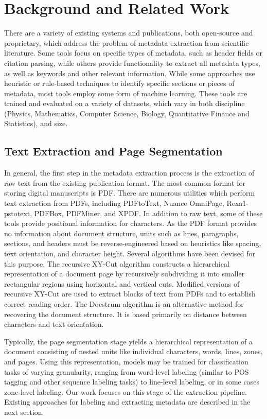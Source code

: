 \documentclass{acm_proc_article-sp}
\begin{document}
\section{Background and Related Work}
There are a variety of existing systems and publications, both open-source and proprietary, which address the problem of metadata extraction from scientific literature. Some tools focus on specific types of metadata, such as header fields or citation parsing, while others provide functionality to extract all metadata types, as well as keywords and other relevant information. While some approaches use heuristic or rule-based techniques to identify specific sections or pieces of metadata, most tools employ some form of machine learning. These tools are trained and evaluated on a variety of datasets, which vary in both discipline (Physics, Mathematics, Computer Science, Biology, Quantitative Finance and Statistics), and size. 

\subsection{Text Extraction and Page Segmentation}
In general, the first step in the metadata extraction process is the extraction of raw text from the existing publication format. The most common format for storing digital manuscripts is PDF. There are numerous utilities which perform text extraction from PDFs, including PDFtoText, Nuance OmniPage, Rexa1-pstotext, PDFBox, PDFMiner, and XPDF. In addition to raw text, some of these tools provide positional information for characters. As the PDF format provides no information about document structure, units such as lines, paragraphs, sections, and headers must be reverse-engineered based on heuristics like spacing, text orientation, and character height. Several algorithms have been devised for this purpose. The recursive XY-Cut algorithm \cite{sutheebanjard2010modified} constructs a hierarchical representation of a document page by recursively subdividing it into smaller rectangular regions using horizontal and vertical cuts. Modified versions of recursive XY-Cut are used to extract blocks of text from PDFs and to establish correct reading order. The Docstrum algorithm is an alternative method for recovering the document structure. It is based primarily on distance between characters and text orientation. \cite{luong2012logical}

Typically, the page segmentation stage yields a hierarchical representation of a document consisting of nested units like individual characters, words, lines, zones, and pages. Using this representation, models may be trained for classification tasks of varying granularity, ranging from word-level labeling (similar to POS tagging and other sequence labeling tasks) to line-level labeling, or in some cases zone-level labeling. Our work focuses on this stage of the extraction pipeline. Existing approaches for labeling and extracting metadata are described in the next section.
\end{document}
